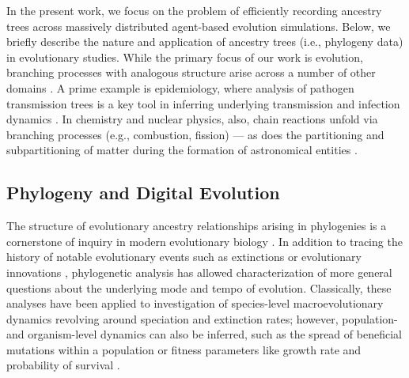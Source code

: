 In the present work, we focus on the problem of efficiently recording ancestry trees across massively distributed agent-based evolution simulations.
Below, we briefly describe the nature and application of ancestry trees (i.e., phylogeny data) in evolutionary studies.
While the primary focus of our work is evolution, branching processes with analogous structure arise across a number of other domains \citep{liben2008tracing,cohen1987computer,friggeri2014rumor}.
A prime example is epidemiology, where analysis of pathogen transmission trees is a key tool in inferring underlying transmission and infection dynamics \citep{giardina2017inference,voznica2022deep,wang2020role,colijn2014phylogenetic}.
In chemistry and nuclear physics, also, chain reactions unfold via branching processes (e.g., combustion, fission) \citep{UsonFornies1999,Pazsit2007} --- as does the partitioning and subpartitioning of matter during the formation of astronomical entities \citep{Jofr2017}.

\subsection{Phylogeny and Digital Evolution}

The structure of evolutionary ancestry relationships arising in phylogenies is a cornerstone of inquiry in modern evolutionary biology \citep{faithConservationEvaluationPhylogenetic1992, STAMATAKIS2005phylogenetics,frenchHostPhylogenyShapes2023,kim2006discovery,lenski2003evolutionary}.
In addition to tracing the history of notable evolutionary events such as extinctions or evolutionary innovations \citep{TODO}, phylogenetic analysis has allowed characterization of more general questions about the underlying mode and tempo of evolution.
Classically, these analyses have been applied to investigation of species-level macroevolutionary dynamics revolving around speciation and extinction rates; however, population- and organism-level dynamics can also be inferred, such as the spread of beneficial mutations within a population or fitness parameters like growth rate and probability of survival \citep{genthon2023cell, levy2015quantitative,stadler2013recovering,moreno2023toward,lewinsohnStatedependentEvolutionaryModels2023a}. %

